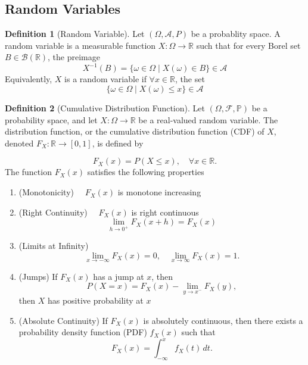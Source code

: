 \documentclass{article}
\theoremstyle{definition}
\newtheorem{definition}{Definition}[section]
\theoremstyle{remark}
\begin{document}
\vspace{.5cm}





\subsection{Random Variables}



\begin{definition}[Random Variable] \label{def: Random_Variable}
Let $(\Omega, \mathcal{A}, P)$ be a probablity space. A random variable
is a measurable function $X : \Omega \to \mathbb{R}$ such that for every 
Borel set $B \in \mathcal{B}(\mathbb{R})$, the preimage 
\[
X^{-1}(B) = \{ \omega \in \Omega \mid X(\omega) \in B \} \in \mathcal{A}
\]
Equivalently, $X$ is a random variable if $\forall x \in \mathbb{R}$, the set
\[
\{ \omega \in \Omega \mid X(\omega) \leq x \} \in \mathcal{A}
\]
\end{definition}


\vspace{.5cm}


\begin{definition}[Cumulative Distribution Function]\label{def:cdf}
Let \( (\Omega, \mathcal{F}, \mathbb{P}) \) be a probability space, and let \( X: \Omega \to \mathbb{R} \) be a real-valued random variable. The distribution 
function, or the cumulative distribution function (CDF) of \( X \), denoted \( F_X: \mathbb{R} \to [0,1] \), is defined by  

\[
F_X(x) = P(X \leq x), \quad \forall x \in \mathbb{R}.
\]
The function \( F_X(x) \) satisfies the following properties  
\begin{enumerate}
\item (Monotonicity) $\quad F_X(x)$ is monotone increasing
\item (Right Continuity) $\quad F_X(x)$ is right continuous\[
\lim_{h\to 0^+} F_X(x+h) = F_X(x)
\]
\item (Limits at Infinity) \[
\lim_{x \to -\infty} F_X(x) = 0, \quad \lim_{x \to \infty} F_X(x) = 1.
\]  
\item (Jumps) If \( F_X(x) \) has a jump at \( x \), then 
\[
P(X = x) = F_X(x) - \lim_{y \to x^-} F_X(y),
\]  
then \( X \) has positive probability at \( x \)
\item (Absolute Continuity) If \( F_X(x) \) is absolutely continuous, then there exists a probability density function (PDF) \( f_X(x) \) such that  
\[
F_X(x) = \int_{-\infty}^{x} f_X(t) \, dt.
\]  
\end{enumerate} 
\end{definition}
\end{document}
